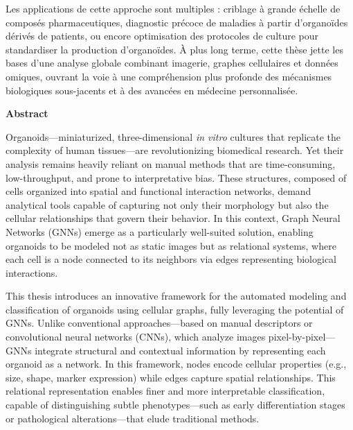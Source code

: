 Les applications de cette approche sont multiples : criblage à grande échelle de composés pharmaceutiques, diagnostic précoce de maladies à partir d'organoïdes dérivés de patients, ou encore optimisation des protocoles de culture pour standardiser la production d'organoïdes. À plus long terme, cette thèse jette les bases d'une analyse globale combinant imagerie, graphes cellulaires et données omiques, ouvrant la voie à une compréhension plus profonde des mécanismes biologiques sous-jacents et à des avancées en médecine personnalisée.

\vspace{0.5cm}

\clearpage
\thispagestyle{empty}
\vspace*{-2cm}

\begin{center}
{\large\bfseries Abstract}\par
\vspace{0.4cm}
\end{center}

Organoids—miniaturized, three-dimensional \textit{in vitro} cultures that replicate the complexity of human tissues—are revolutionizing biomedical research. Yet their analysis remains heavily reliant on manual methods that are time-consuming, low-throughput, and prone to interpretative bias. These structures, composed of cells organized into spatial and functional interaction networks, demand analytical tools capable of capturing not only their morphology but also the cellular relationships that govern their behavior. In this context, Graph Neural Networks (GNNs) emerge as a particularly well-suited solution, enabling organoids to be modeled not as static images but as relational systems, where each cell is a node connected to its neighbors via edges representing biological interactions.

This thesis introduces an innovative framework for the automated modeling and classification of organoids using cellular graphs, fully leveraging the potential of GNNs. Unlike conventional approaches—based on manual descriptors or convolutional neural networks (CNNs), which analyze images pixel-by-pixel—GNNs integrate structural and contextual information by representing each organoid as a network. In this framework, nodes encode cellular properties (e.g., size, shape, marker expression) while edges capture spatial relationships. This relational representation enables finer and more interpretable classification, capable of distinguishing subtle phenotypes—such as early differentiation stages or pathological alterations—that elude traditional methods.


